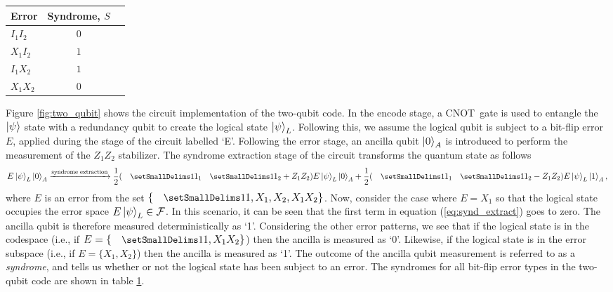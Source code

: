 \documentclass[]{arxiv}
\theoremstyle{plain}%
\theoremstyle{definition}
\theoremstyle{remark}
\DeclareRobustCommand\openone{\leavevmode\hbox{\small1\normalsize\kern-.33em1}}
\newcommand{\cnot}{\leavevmode\hbox{\footnotesize{CNOT }}}
\begin{document}
\begin{table}
		\def\arraystretch{1.3}
	{\begin{tabular}{lcc} \toprule
		
		Error & Syndrome, $S$ \\\midrule
		$I_1 I_2$ & $0$\\
		$X_1I_2$ & $1$\\
		$I_1 X_2$ & $1$\\
		$X_1 X_2$ & $0$\\
		
		  \bottomrule
	\end{tabular}}
	\label{tab:two_qubit}
\end{table}

Figure \ref{fig:two_qubit} shows the circuit implementation of the two-qubit code. In the encode stage, a \cnot gate is used to entangle the $\ket{\psi}$ state with a redundancy qubit to create the logical state $\ket{\psi}_L$. Following this, we assume the logical qubit is subject to a bit-flip error $E$, applied during the stage of the circuit labelled `E'. Following the error stage, an ancilla qubit $\ket{0}_A$ is introduced to perform the measurement of the $Z_1Z_2$ stabilizer. The syndrome extraction stage of the circuit transforms the quantum state as follows
%
\begin{equation} \label{eq:synd_extract}
E\ket{\psi}_L \ket{0}_A \xrightarrow[]{\text{syndrome extraction}} \dfrac{1}{2}(\openone_1\openone_2 + Z_1Z_2)E\ket{\psi}_L \ket{0}_A + \dfrac{1}{2}(\openone_1\openone_2 - Z_1Z_2)E\ket{\psi}_L \ket{1}_A\rm,
\end{equation}
%
where $E$ is an error from the set $\{\openone, X_1, X_2, X_1X_2\}$. Now, consider the case where $E=X_1$ so that the logical state occupies the error space $E\ket{\psi}_L \in \mathcal{F}$. In this scenario, it can be seen that the first term in equation (\ref{eq:synd_extract}) goes to zero. The ancilla qubit is therefore measured deterministically as `1'. Considering the other error patterns, we see that if the logical state is in the codespace (i.e., if $E=\{\openone, X_1X_2\}$) then the ancilla is measured as `0'. Likewise, if the logical state is in the error subspace (i.e., if $E=\{X_1,X_2\}$) then the ancilla is measured as `1'. The outcome of the ancilla qubit measurement is referred to as a \textit{syndrome}, and tells us whether or not the logical state has been subject to an error. The syndromes for all bit-flip error types in the two-qubit code are shown in table \ref{tab:two_qubit}.
\end{document}
